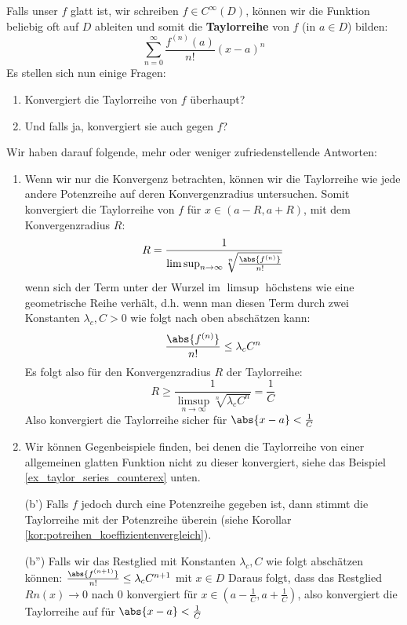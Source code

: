 Falls unser $f$ glatt ist, wir schreiben $f \in C^\infty(D)$, können wir die Funktion beliebig oft auf $D$ ableiten und somit die \textbf{Taylorreihe} von $f$ (in $a \in D$) bilden:
$$\sum_{n=0}^\infty \frac{f^{(n)}(a)}{n!}(x-a)^{n}$$
Es stellen sich nun einige Fragen:
\begin{enumerate}[label=(\alph*)]
    \item Konvergiert die Taylorreihe von $f$ überhaupt?
    \item Und falls ja, konvergiert sie auch gegen $f$?
\end{enumerate}
Wir haben darauf folgende, mehr oder weniger zufriedenstellende Antworten:
\begin{enumerate}[label=(\alph*)]
    \item Wenn wir nur die Konvergenz betrachten, können wir die Taylorreihe wie jede andere Potenzreihe auf deren Konvergenzradius untersuchen. Somit konvergiert die Taylorreihe von $f$ für $x \in (a-R,a+R)$, mit dem Konvergenzradius $R$:
    $$R= \frac{1}{\limsup_{n \to \infty}\sqrt[n]{\frac{\abs{f^{(n)}}}{n!}}}$$
    wenn sich der Term unter der Wurzel im $\limsup$ höchstens wie eine geometrische Reihe verhält, d.h. wenn man diesen Term durch zwei Konstanten $\lambda_c, C > 0$ wie folgt nach oben abschätzen kann:
    $$\frac{\abs{f^{(n)}}}{n!} \leq \lambda_c C^n$$
    Es folgt also für den Konvergenzradius $R$ der Taylorreihe:
    $$R \geq \frac{1}{\limsup_{n \to \infty}\sqrt[n]{\lambda_c C^n}} = \frac{1}{C}$$
    Also konvergiert die Taylorreihe sicher für $\abs{x-a} < \frac{1}{C}$
    \item Wir können Gegenbeispiele finden, bei denen die Taylorreihe von einer allgemeinen glatten Funktion nicht zu dieser konvergiert, siehe das Beispiel \ref{ex_taylor_series_counterex} unten.
    \item[(b')] Falls $f$ jedoch durch eine Potenzreihe gegeben ist, dann stimmt die Taylorreihe mit der Potenzreihe überein (siehe Korollar \ref{kor:potreihen_koeffizientenvergleich}).
    \item[(b'')] Falls wir das Restglied mit Konstanten $\lambda_c, C$ wie folgt abschätzen können: $\frac{\abs{f^{(n+1)}}}{n!} \leq \lambda_c C^{n+1}$ mit $x\in D$  Daraus folgt, dass das Restglied $Rn(x) \to 0$ nach 0 konvergiert für $x \in (a-\frac{1}{C}, a+\frac{1}{C})$, also konvergiert die Taylorreihe auf für $\abs{x-a} < \frac{1}{C}$
\end{enumerate}


